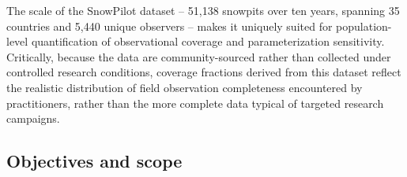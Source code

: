 \documentclass[hess, manuscript]{copernicus}
\begin{document}

The scale of the SnowPilot dataset -- 51{,}138 snowpits over ten years, spanning 35 countries and 5{,}440 unique observers -- makes it uniquely suited for population-level quantification of observational coverage and parameterization sensitivity. Critically, because the data are community-sourced rather than collected under controlled research conditions, coverage fractions derived from this dataset reflect the realistic distribution of field observation completeness encountered by practitioners, rather than the more complete data typical of targeted research campaigns.

\FloatBarrier

\subsection{Objectives and scope}
\end{document}
